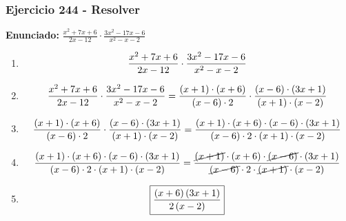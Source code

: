 \documentclass[11pt,a4paper]{article}
\newcommand{\fitmath}[1]{%
\[
\setbox0=\hbox{$\displaystyle #1$}%
\ifdim\wd0>\linewidth
\resizebox{\linewidth}{!}{$\displaystyle #1$}%
\else
#1%
\fi
\]
}
\begin{document}
\subsubsection*{Ejercicio 244 - Resolver}
\textbf{Enunciado:} $ \frac{x^{2} + 7 x + 6}{2 x - 12} \cdot \frac{3 x^{2} - 17 x - 6}{x^{2} - x - 2} $\par
\begin{enumerate}[leftmargin=2em]
\item \fitmath{\frac{x^{2} + 7 x + 6}{2 x - 12} \cdot \frac{3 x^{2} - 17 x - 6}{x^{2} - x - 2}}
\item \fitmath{\frac{x^{2} + 7 x + 6}{2 x - 12} \cdot \frac{3 x^{2} - 17 x - 6}{x^{2} - x - 2}= \frac{\left(x + 1\right)\cdot \left(x + 6\right)}{\left(x - 6\right)\cdot 2} \cdot \frac{\left(x - 6\right)\cdot \left(3 x + 1\right)}{\left(x + 1\right)\cdot \left(x - 2\right)}}
\item \fitmath{\frac{\left(x + 1\right)\cdot \left(x + 6\right)}{\left(x - 6\right)\cdot 2}\cdot \frac{\left(x - 6\right)\cdot \left(3 x + 1\right)}{\left(x + 1\right)\cdot \left(x - 2\right)}= \frac{\left(x + 1\right)\cdot \left(x + 6\right)\cdot \left(x - 6\right)\cdot \left(3 x + 1\right)}{\left(x - 6\right)\cdot 2\cdot \left(x + 1\right)\cdot \left(x - 2\right)}}
\item \fitmath{\frac{\left(x + 1\right)\cdot \left(x + 6\right)\cdot \left(x - 6\right)\cdot \left(3 x + 1\right)}{\left(x - 6\right)\cdot 2\cdot \left(x + 1\right)\cdot \left(x - 2\right)}= \frac{\cancel{\left(x + 1\right)}\cdot \left(x + 6\right)\cdot \cancel{\left(x - 6\right)}\cdot \left(3 x + 1\right)}{\cancel{\left(x - 6\right)}\cdot 2\cdot \cancel{\left(x + 1\right)}\cdot \left(x - 2\right)}}
\item \fitmath{\boxed{\frac{\left(x + 6\right) \left(3 x + 1\right)}{2 \left(x - 2\right)}}}
\end{enumerate}

\vspace{0.12cm}
\end{document}
